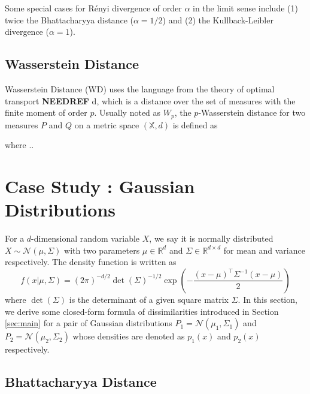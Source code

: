 \documentclass[11pt]{article}
\newcommand{\calN}{\mathcal{N}}
\newcommand{\bbR}{\mathbb{R}}
\newcommand{\bbX}{\mathbb{X}}
\newcommand{\needref}{\textbf{NEEDREF} }
\newcommand{\Renyi}{R\'{e}nyi }
\begin{document}
Some special cases for \Renyi divergence of order $\alpha$ in the limit sense include (1) twice the Bhattacharyya distance ($\alpha=1/2$) and (2) the Kullback-Leibler divergence ($\alpha=1$).

\subsection{Wasserstein Distance}\label{diss:WD}

Wasserstein Distance (WD) uses the language from the theory of optimal transport \needref{d}, which is a distance over the set of measures with the finite moment of order $p$. Usually noted as $W_p$, the $p$-Wasserstein distance for two measures $P$ and $Q$ on a metric space $(\bbX, d)$ is defined as

\begin{center}
\end{center}

where .. 


\section{Case Study : Gaussian Distributions}\label{sec:gaussian}

For a $d$-dimensional random variable $X$, we say it is normally distributed $X \sim \calN(\mu,\Sigma)$ with two parameters $\mu \in \bbR^d$ and $\Sigma \in \bbR^{d\times d}$ for mean and variance respectively. The density function is written as
\begin{equation}\label{def:gaussian}
f(x\vert \mu, \Sigma) = (2\pi)^{-d/2} \det (\Sigma)^{-1/2} \exp \left( - \frac{(x-\mu)^\top \Sigma^{-1} (x-\mu)}{2}\right)
\end{equation}
where $\det(\Sigma)$ is the determinant of a given square matrix $\Sigma$. In this section, we derive some closed-form formula of dissimilarities introduced in Section \ref{sec:main} for a pair of Gaussian distributions $P_1 = \calN(\mu_1,\Sigma_1)$ and $P_2 = \calN(\mu_2, \Sigma_2)$ whose densities are denoted as $p_1(x)$ and $p_2(x)$ respectively. 

\subsection*{Bhattacharyya Distance}
\end{document}
